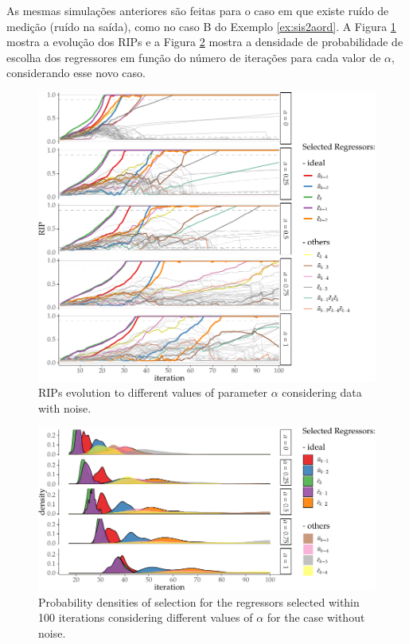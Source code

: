 \begin{exmp}
As mesmas simulações anteriores são feitas para o caso em que existe ruído de medição (ruído na saída), como no caso B do Exemplo \ref{ex:sis2aord}. A Figura \ref{fig:exp51_ev_rips_a1_CR} mostra a evolução dos RIPs e a Figura \ref{fig:exp51_dens_prob_CR} mostra a densidade de probabilidade de escolha dos regressores em função do número de iterações para cada valor de $\alpha$, considerando esse novo caso.

  \begin{figure}[htpb]
    \centering
    \includegraphics{Figs/Cap5/ex51_rips_evol_CR.tex.pdf}
    \caption{RIPs evolution to different values of parameter $\alpha$ considering data with noise.}
    \label{fig:exp51_ev_rips_a1_CR}
  \end{figure}



  \begin{figure}[htpb]
    \centering
    \includegraphics{Figs/Cap5/ex51_iter_con_COM_ruido.tex.pdf}
    \caption{Probability densities of selection for the regressors selected within 100 iterations considering different values of $\alpha$ for the case without noise.}
    \label{fig:exp51_dens_prob_CR}
  \end{figure}


\end{exmp}
